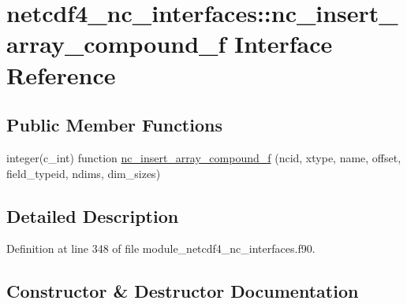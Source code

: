 \hypertarget{interfacenetcdf4__nc__interfaces_1_1nc__insert__array__compound__f}{}\section{netcdf4\+\_\+nc\+\_\+interfaces\+:\+:nc\+\_\+insert\+\_\+array\+\_\+compound\+\_\+f Interface Reference}
\label{interfacenetcdf4__nc__interfaces_1_1nc__insert__array__compound__f}
\subsection*{Public Member Functions}
\begin{DoxyCompactItemize}
\item 
integer(c\+\_\+int) function \hyperlink{interfacenetcdf4__nc__interfaces_1_1nc__insert__array__compound__f_a178b4d1a78d6f0de829180cecf1a7423}{nc\+\_\+insert\+\_\+array\+\_\+compound\+\_\+f} (ncid, xtype, name, offset, field\+\_\+typeid, ndims, dim\+\_\+sizes)
\end{DoxyCompactItemize}


\subsection{Detailed Description}


Definition at line 348 of file module\+\_\+netcdf4\+\_\+nc\+\_\+interfaces.\+f90.



\subsection{Constructor \& Destructor Documentation}
\mbox{\label{interfacenetcdf4__nc__interfaces_1_1nc__insert__array__compound__f_a178b4d1a78d6f0de829180cecf1a7423}} 
